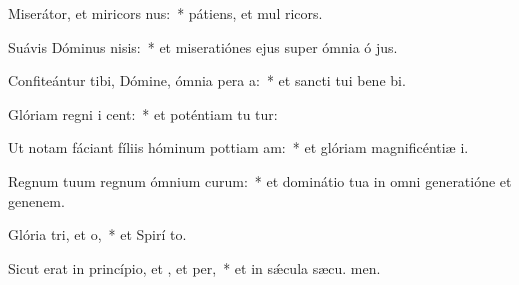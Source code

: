 \item Miserátor, et miricors nus:~* pátiens, et mul ricors.
\item Suávis Dóminus nisis:~* et miseratiónes ejus super ómnia ó jus.
\item Confiteántur tibi, Dómine, ómnia pera a:~* et sancti tui bene bi.
\item Glóriam regni i cent:~* et poténtiam tu tur:
\item Ut notam fáciant fíliis hóminum pottiam am:~* et glóriam magnificéntiæ  i.
\item Regnum tuum regnum ómnium curum:~* et dominátio tua in omni generatióne et genenem.
\item Glória tri, et o,~* et Spirí to.
\item Sicut erat in princípio, et , et per,~* et in sǽcula sæcu. men.
